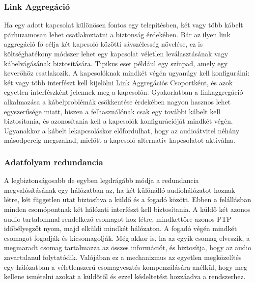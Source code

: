 \subsubsection{Link Aggregáció}
Ha egy adott kapcsolat különösen fontos egy telepítésben, két vagy több kábelt párhuzamosan
lehet csatlakoztatni a biztonság érdekében. 
Bár az ilyen link aggregáció fő célja két kapcsoló közötti sávszélesség növelése, 
ez is költséghatékony módszer lehet egy kapcsolat véletlen leválasztásának
vagy kábelvágásának biztosítására. Tipikus eset például egy színpad, amely egy keverőhöz
csatlakozik. A kapcsolóknak mindkét végén ugyanúgy kell konfigurálni: két vagy
több interfészt kell kijelölni Link Aggregációs Csoportként, és azok
egyetlen interfészként jelennek meg a kapcsolón. Gyakorlatban a linkaggregáció
alkalmazása a kábelproblémák csökkentése érdekében nagyon hasznos lehet
egyszerűsége miatt, hiszen a felhasználónak csak egy további kábelt kell
biztosítania, és azonosítania kell a kapcsolók konfigurációját mindkét végén.
Ugyanakkor a kábelt lekapcsoláskor előfordulhat, hogy az audioátvitel
néhány másodpercig megszakad, mielőtt a kapcsoló alternatív kapcsolatot
aktiválna.
\subsubsection{ Adatfolyam redundancia}
A legbiztonságosabb de egyben legdrágább módja a redundancia megvalósításának
egy hálózatban az, ha két különálló audiohálózatot hoznak létre, 
két független utat biztosítva a küldő és a fogadó között. 
Ebben a felállásban minden csomópontnak két hálózati interfészt
kell biztosítania. A küldő két azonos audio tartalommal rendelkező csomagot hoz létre,
mindkettőre azonos PTP-időbélyegzőt nyom, majd elküldi mindkét hálózaton.
A fogadó végén mindkét csomagot fogadják és kicsomagolják. Még akkor is, ha az egyik csomag
elveszik, a megmaradt csomag tartalmazza az összes információt, és biztosítja,
hogy az audio zavartalanul folytatódik. Valójában ez a mechanizmus az egyetlen
megközelítés egy hálózatban a véletlenszerű csomagvesztés kompenzálására anélkül,
hogy meg kellene ismételni azokat a küldőtől és ezzel késleltetést hozzáadva a rendszerhez.
